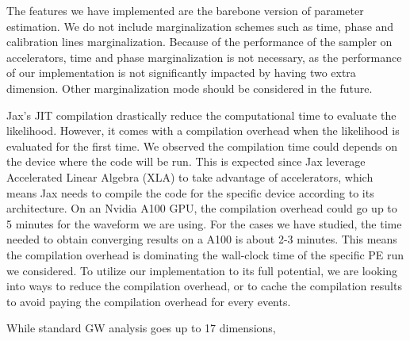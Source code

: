 \documentclass[twocolumn]{aastex631}
\begin{document}

The features we have implemented are the barebone version of parameter
estimation. We do not include marginalization schemes such as time, phase and
calibration lines marginalization. Because of the performance of the sampler on
accelerators, time and phase marginalization is not necessary, as the
performance of our implementation is not significantly impacted by having two
extra dimension. Other marginalization mode should be considered in the future.

Jax's JIT compilation drastically reduce the computational time to evaluate the
likelihood. However, it comes with a compilation overhead when the likelihood is
evaluated for the first time. We observed the compilation time could depends on
the device where the code will be run. This is expected since Jax leverage
Accelerated Linear Algebra (XLA) to take advantage of accelerators, which means
Jax needs to compile the code for the specific device according to its
architecture. On an Nvidia A100 GPU, the compilation overhead could go up to 5
minutes for the waveform we are using. For the cases we have studied, the time
needed to obtain converging results on a A100 is about 2-3 minutes. This means
the compilation overhead is dominating the wall-clock time of the specific PE
run we considered. To utilize our implementation to its full potential, we are
looking into ways to reduce the compilation overhead, or to cache the
compilation results to avoid paying the compilation overhead for every events.

While standard GW analysis goes up to 17 dimensions, 

\end{document}
